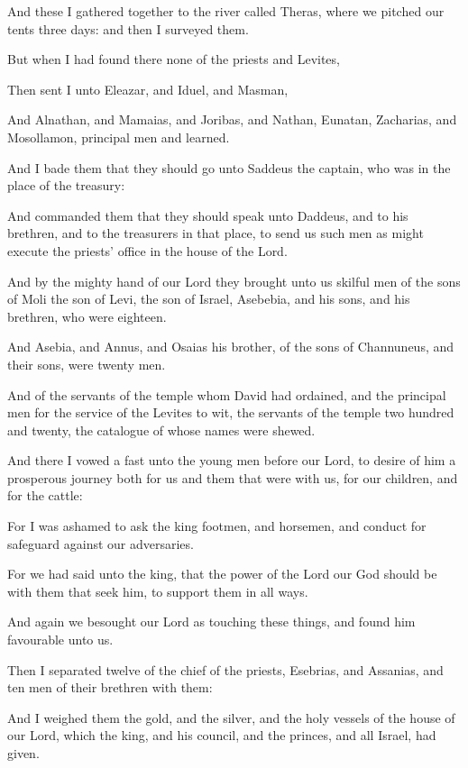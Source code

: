 {\par }{\PP {}And these I gathered together to the river called Theras, where we pitched our tents three days: and then I surveyed them.
\par }{\PP {}But when I had found there none of the priests and Levites,
\par }{\PP {}Then sent I unto Eleazar, and Iduel, and Masman,
\par }{\PP {}And Alnathan, and Mamaias, and Joribas, and Nathan, Eunatan, Zacharias, and Mosollamon, principal men and learned.
\par }{\PP {}And I bade them that they should go unto Saddeus the captain, who was in the place of the treasury:
\par }{\PP {}And commanded them that they should speak unto Daddeus, and to his brethren, and to the treasurers in that place, to send us such men as might execute the priests’ office in the house of the Lord.
\par }{\PP {}And by the mighty hand of our Lord they brought unto us skilful men of the sons of Moli the son of Levi, the son of Israel, Asebebia, and his sons, and his brethren, who were eighteen.
\par }{\PP {}And Asebia, and Annus, and Osaias his brother, of the sons of Channuneus, and their sons, were twenty men.
\par }{\PP {}And of the servants of the temple whom David had ordained, and the principal men for the service of the Levites to wit, the servants of the temple two hundred and twenty, the catalogue of whose names were shewed.
\par }{\PP {}And there I vowed a fast unto the young men before our Lord, to desire of him a prosperous journey both for us and them that were with us, for our children, and for the cattle:
\par }{\PP {}For I was ashamed to ask the king footmen, and horsemen, and conduct for safeguard against our adversaries.
\par }{\PP {}For we had said unto the king, that the power of the Lord our God should be with them that seek him, to support them in all ways.
\par }{\PP {}And again we besought our Lord as touching these things, and found him favourable unto us.
\par }{\PP {}Then I separated twelve of the chief of the priests, Esebrias, and Assanias, and ten men of their brethren with them:
\par }{\PP {}And I weighed them the gold, and the silver, and the holy vessels of the house of our Lord, which the king, and his council, and the princes, and all Israel, had given.
}
